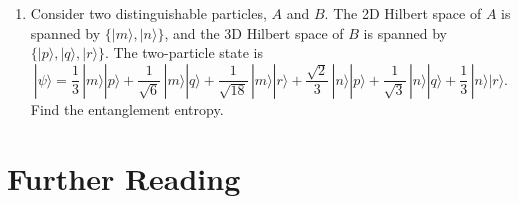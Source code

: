 \documentclass[pra,12pt]{revtex4}
\begin{document}
\begin{enumerate}
\item 
  Consider two distinguishable particles, $A$ and $B$.  The 2D Hilbert
  space of $A$ is spanned by $\{|m\rangle, |n\rangle\}$, and the
  3D Hilbert space of $B$ is spanned by $\{|p\rangle, |q\rangle,
  |r\rangle\}$.  The two-particle state is
\begin{equation}
  |\psi\rangle = \frac{1}{3} \, |m\rangle|p\rangle
+ \frac{1}{\sqrt{6}} \, |m\rangle|q\rangle
+ \frac{1}{\sqrt{18}} \, |m\rangle|r\rangle
+ \frac{\sqrt{2}}{3} \, |n\rangle|p\rangle
+ \frac{1}{\sqrt{3}} \, |n\rangle|q\rangle
+ \frac{1}{3} \, |n\rangle|r\rangle.
\end{equation}
Find the entanglement entropy.

\end{enumerate}

\section*{Further Reading}
\end{document}
